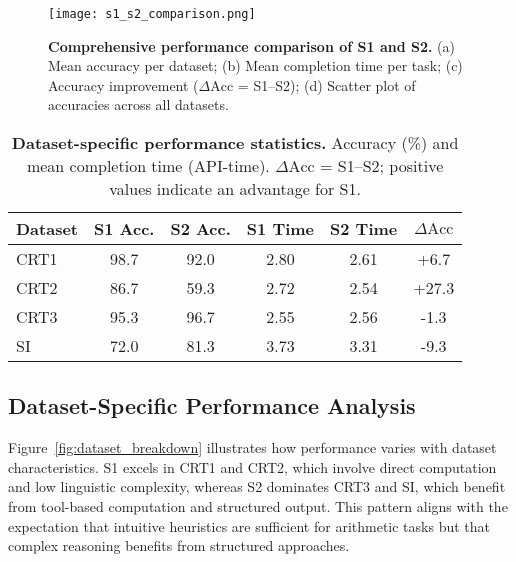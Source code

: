 \documentclass[11pt]{article}
\begin{document}
\begin{figure}[t]
  \centering
  \texttt{[image: s1\_s2\_comparison.png]}
  \caption{\textbf{Comprehensive performance comparison of S1 and S2.}
    (a) Mean accuracy per dataset;
    (b) Mean completion time per task;
    (c) Accuracy improvement (\(\Delta \mathrm{Acc}\) = S1--S2);
    (d) Scatter plot of accuracies across all datasets.}
  \label{fig:s1s2_comparison}
\end{figure}
\FloatBarrier

\begin{table}[t]
  \centering
  \small
  \caption{\textbf{Dataset-specific performance statistics.}  Accuracy
    (\%) and mean completion time (API-time).  $\Delta\text{Acc}$ = S1--S2;
    positive values indicate an advantage for S1.}
  \label{tab:dataset_performance}
  \begin{tabular}{lccccc}
    \toprule
    Dataset & S1 Acc. & S2 Acc. & S1 Time & S2 Time & $\Delta\text{Acc}$ \\
    \midrule
    CRT1 & 98.7 & 92.0 & 2.80 & 2.61 & +6.7 \\
    CRT2 & 86.7 & 59.3 & 2.72 & 2.54 & +27.3 \\
    CRT3 & 95.3 & 96.7 & 2.55 & 2.56 & -1.3 \\
    SI   & 72.0 & 81.3 & 3.73 & 3.31 & -9.3 \\
    \bottomrule
  \end{tabular}
\end{table}
\FloatBarrier

\subsection{Dataset-Specific Performance Analysis}
Figure~\ref{fig:dataset_breakdown} illustrates how performance varies with
dataset characteristics.  S1 excels in CRT1 and CRT2, which involve direct
computation and low linguistic complexity, whereas S2 dominates CRT3 and SI,
which benefit from tool-based computation and structured output.
This pattern aligns with the expectation that intuitive heuristics are
sufficient for arithmetic tasks but that complex reasoning benefits from
structured approaches.
\end{document}
